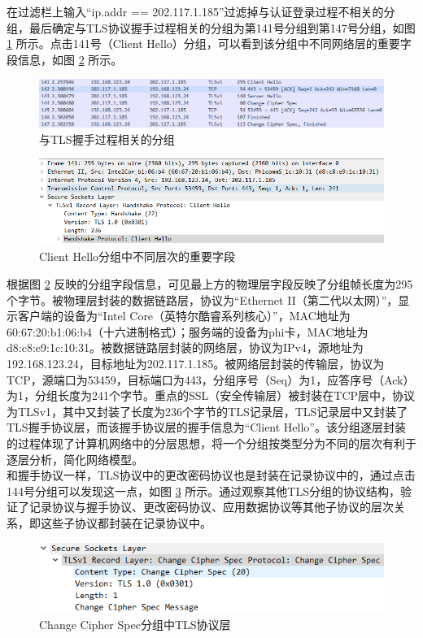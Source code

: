 \qquad
在过滤栏上输入“ip.addr == 202.117.1.185”过滤掉与认证登录过程不相关的分组，最后确定与TLS协议握手过程相关的分组为第141号分组到第147号分组，如图 \ref{fig6} 所示。点击141号（Client Hello）分组，可以看到该分组中不同网络层的重要字段信息，如图 \ref{fig7} 所示。\\
\begin{figure}
	\centering
	\includegraphics[width=12cm]{image/TLS-1}
	\caption{与TLS握手过程相关的分组}
	\label{fig6}
\end{figure}
\begin{figure}
	\centering
	\includegraphics[width=12cm]{image/layer-1}
	\caption{Client Hello分组中不同层次的重要字段}
	\label{fig7}
\end{figure}
\qquad
根据图 \ref{fig7} 反映的分组字段信息，可见最上方的物理层字段反映了分组帧长度为295个字节。被物理层封装的数据链路层，协议为“Ethernet II（第二代以太网）”，显示客户端的设备为“Intel Core（英特尔酷睿系列核心）”，MAC地址为60:67:20:b1:06:b4（十六进制格式）；服务端的设备为phi卡，MAC地址为d8:c8:e9:1c:10:31。被数据链路层封装的网络层，协议为IPv4，源地址为192.168.123.24，目标地址为202.117.1.185。被网络层封装的传输层，协议为TCP，源端口为53459，目标端口为443，分组序号（Seq）为1，应答序号（Ack）为1，分组长度为241个字节。重点的SSL（安全传输层）被封装在TCP层中，协议为TLSv1，其中又封装了长度为236个字节的TLS记录层，TLS记录层中又封装了TLS握手协议层，而该握手协议层的握手信息为“Client Hello”。该分组逐层封装的过程体现了计算机网络中的分层思想，将一个分组按类型分为不同的层次有利于逐层分析，简化网络模型。\\
\qquad
和握手协议一样，TLS协议中的更改密码协议也是封装在记录协议中的，通过点击144号分组可以发现这一点，如图 \ref{fig8} 所示。通过观察其他TLS分组的协议结构，验证了记录协议与握手协议、更改密码协议、应用数据协议等其他子协议的层次关系，即这些子协议都封装在记录协议中。\\
\begin{figure}
	\centering
	\includegraphics[width=12cm]{image/layer-2}
	\caption{Change Cipher Spec分组中TLS协议层}
	\label{fig8}
\end{figure}
